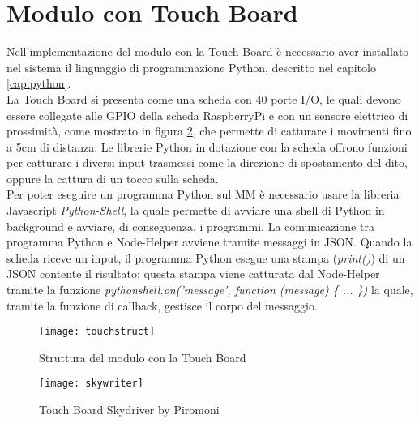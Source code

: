 \section{Modulo con Touch Board}\label{cap:touch}
Nell'implementazione del modulo con la Touch Board \`e necessario aver installato nel sistema
il linguaggio di programmazione Python, descritto nel capitolo \ref{cap:python}.\\
La Touch Board si presenta come una scheda con 40 porte I/O, le quali devono essere collegate alle
GPIO della scheda RaspberryPi e con un sensore elettrico di prossimit\`a, come mostrato in figura \ref{fig:TouchBoard}, che permette di catturare i movimenti fino a 5cm di distanza.
Le librerie Python in dotazione con la scheda offrono funzioni per catturare i diversi input trasmessi come
la direzione di spostamento del dito, oppure la cattura di un tocco sulla scheda.\\
Per poter eseguire un programma Python sul MM \`e necessario usare la libreria Javascript \emph{Python-Shell}, la quale
permette di avviare una shell di Python in background e avviare, di conseguenza, i programmi.
La comunicazione tra programma Python e Node-Helper avviene tramite messaggi in JSON. Quando la scheda riceve un input,
il programma Python esegue una stampa (\emph{print()}) di un JSON contente il risultato; questa stampa viene catturata dal
Node-Helper tramite la funzione \emph{pythonshell.on('message', function (message) \{ ... \})} la quale, tramite la funzione di callback,
gestisce il corpo del messaggio.
\begin{figure}[H]
    \texttt{[image: touchstruct]}
    \caption{Struttura del modulo con la Touch Board}
    \label{fig:structtouch}
\end{figure}

\begin{figure}[H]
    \texttt{[image: skywriter]}
    \caption{Touch Board Skydriver by Piromoni}
    \label{fig:TouchBoard}
\end{figure}
